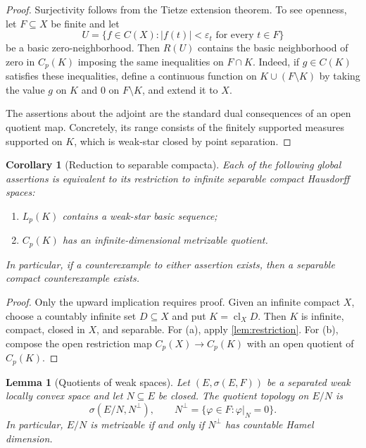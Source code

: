 \documentclass[11pt]{article}
\newtheorem{lemma}[theorem]{Lemma}
\newtheorem{corollary}[theorem]{Corollary}
\newcommand{\Cp}{C_p}
\newcommand{\Lp}{L_p}
\newcommand{\cl}{\operatorname{cl}}
\begin{document}
\begin{proof}
Surjectivity follows from the Tietze extension theorem.  To see openness, let
$F\subseteq X$ be finite and let
\[
 U=\{f\in C(X): |f(t)|<\varepsilon_t\text{ for every }t\in F\}
\]
be a basic zero-neighborhood.  Then $R(U)$ contains the basic neighborhood of
zero in $\Cp(K)$ imposing the same inequalities on $F\cap K$.  Indeed, if
$g\in C(K)$ satisfies these inequalities, define a continuous function on
$K\cup(F\setminus K)$ by taking the value $g$ on $K$ and $0$ on
$F\setminus K$, and extend it to $X$.

The assertions about the adjoint are the standard dual consequences of an
open quotient map.  Concretely, its range consists of the finitely supported
measures supported on $K$, which is weak-star closed by point separation.
\end{proof}

\begin{corollary}[Reduction to separable compacta]\label{cor:separable-reduction}
Each of the following global assertions is equivalent to its restriction to
infinite separable compact Hausdorff spaces:
\begin{enumerate}[label=\textup{(\alph*)}]
\item $\Lp(K)$ contains a weak-star basic sequence;
\item $\Cp(K)$ has an infinite-dimensional metrizable quotient.
\end{enumerate}
In particular, if a counterexample to either assertion exists, then a
separable compact counterexample exists.
\end{corollary}

\begin{proof}
Only the upward implication requires proof.  Given an infinite compact $X$,
choose a countably infinite set $D\subseteq X$ and put $K=\cl_XD$.  Then $K$
is infinite, compact, closed in $X$, and separable.  For \textup{(a)}, apply
\cref{lem:restriction}.  For \textup{(b)}, compose the open restriction map
$\Cp(X)\to\Cp(K)$ with an open quotient of $\Cp(K)$.
\end{proof}

\begin{lemma}[Quotients of weak spaces]\label{lem:weak-quotient}
Let $(E,\sigma(E,F))$ be a separated weak locally convex space and let
$N\subseteq E$ be closed.  The quotient topology on $E/N$ is
\[
 \sigma(E/N,N^\perp),
 \qquad
 N^\perp=\{\varphi\in F:\varphi|_N=0\}.
\]
In particular, $E/N$ is metrizable if and only if $N^\perp$ has countable
Hamel dimension.
\end{lemma}
\end{document}
